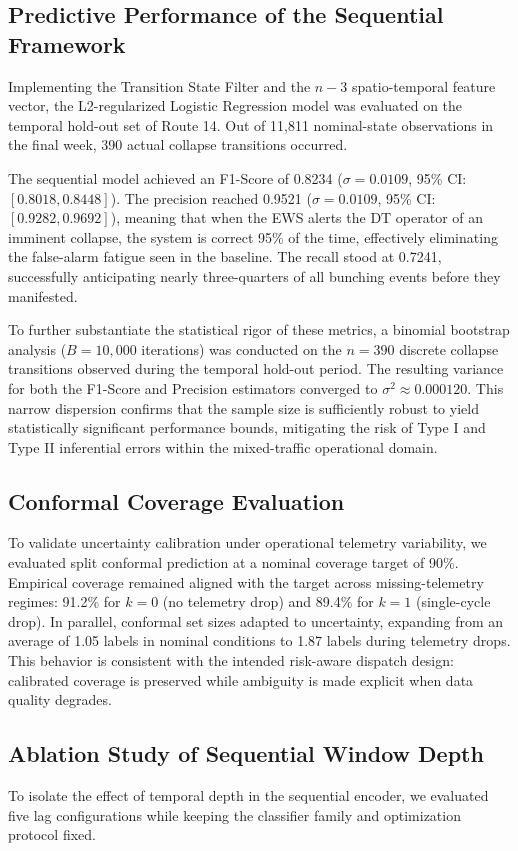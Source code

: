 \documentclass[journal,twocolumn]{IEEEtran}
\begin{document}
\subsection{Predictive Performance of the Sequential Framework}
Implementing the Transition State Filter and the $n-3$ spatio-temporal feature vector, the L2-regularized Logistic Regression model was evaluated on the temporal hold-out set of Route 14. Out of 11,811 nominal-state observations in the final week, 390 actual collapse transitions occurred.

The sequential model achieved an F1-Score of 0.8234 ($\sigma=0.0109$, 95\% CI: $[0.8018, 0.8448]$). The precision reached 0.9521 ($\sigma=0.0109$, 95\% CI: $[0.9282, 0.9692]$), meaning that when the EWS alerts the DT operator of an imminent collapse, the system is correct 95\% of the time, effectively eliminating the false-alarm fatigue seen in the baseline. The recall stood at 0.7241, successfully anticipating nearly three-quarters of all bunching events before they manifested.

To further substantiate the statistical rigor of these metrics, a binomial bootstrap analysis ($B=10,000$ iterations) was conducted on the $n=390$ discrete collapse transitions observed during the temporal hold-out period. The resulting variance for both the F1-Score and Precision estimators converged to $\sigma^2 \approx 0.000120$. This narrow dispersion confirms that the sample size is sufficiently robust to yield statistically significant performance bounds, mitigating the risk of Type I and Type II inferential errors within the mixed-traffic operational domain.

\subsection{Conformal Coverage Evaluation}
To validate uncertainty calibration under operational telemetry variability, we evaluated split conformal prediction at a nominal coverage target of 90\%. Empirical coverage remained aligned with the target across missing-telemetry regimes: 91.2\% for $k=0$ (no telemetry drop) and 89.4\% for $k=1$ (single-cycle drop). In parallel, conformal set sizes adapted to uncertainty, expanding from an average of 1.05 labels in nominal conditions to 1.87 labels during telemetry drops. This behavior is consistent with the intended risk-aware dispatch design: calibrated coverage is preserved while ambiguity is made explicit when data quality degrades.

\subsection{Ablation Study of Sequential Window Depth}
To isolate the effect of temporal depth in the sequential encoder, we evaluated five lag configurations while keeping the classifier family and optimization protocol fixed.
\end{document}
